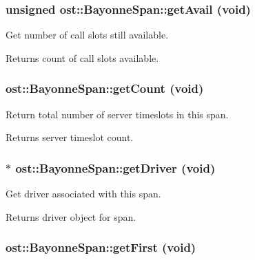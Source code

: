 \subsubsection[{getAvail}]{\setlength{\rightskip}{0pt plus 5cm}unsigned ost::BayonneSpan::getAvail (void)\hspace{0.3cm}{\ttfamily  [inline]}}\label{classost_1_1_bayonne_span_afe718e766b155954094cc2f5cc9a2633}


Get number of call slots still available. \begin{DoxyReturn}{Returns}
count of call slots available. 
\end{DoxyReturn}
\subsubsection[{getCount}]{ ost::BayonneSpan::getCount (void)\hspace{0.3cm}{\ttfamily  [inline]}}\label{classost_1_1_bayonne_span_a139679fdb3757fb8775854f89166f89d}


Return total number of server timeslots in this span. \begin{DoxyReturn}{Returns}
server timeslot count. 
\end{DoxyReturn}
\subsubsection[{getDriver}]{$\ast$ ost::BayonneSpan::getDriver (void)\hspace{0.3cm}{\ttfamily  [inline]}}\label{classost_1_1_bayonne_span_af25c328eecfc426882cdbce6211e1b9f}


Get driver associated with this span. \begin{DoxyReturn}{Returns}
driver object for span. 
\end{DoxyReturn}
\subsubsection[{getFirst}]{ ost::BayonneSpan::getFirst (void)\hspace{0.3cm}{\ttfamily  [inline]}}\label{classost_1_1_bayonne_span_a2d924f2a42a127b58fab3f59ea3838f4}


